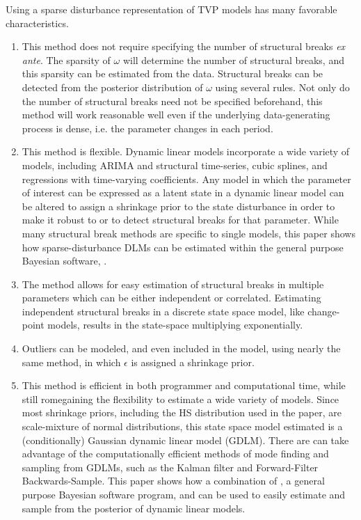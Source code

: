 \documentclass{article}
\begin{document}
Using a sparse disturbance representation of TVP models has many favorable characteristics.
\begin{enumerate}
\item This method does not require specifying the number of structural breaks \textit{ex ante}.
The sparsity of $\omega$ will determine the number of structural breaks, and this sparsity can be estimated from the data.
Structural breaks can be detected from the posterior distribution of $\omega$ using several rules.
Not only do the number of structural breaks need not be specified beforehand, this method will work reasonable well even if the underlying data-generating process is dense, i.e. the parameter changes in each period.
\item This method is flexible.
Dynamic linear models incorporate a wide variety of models, including ARIMA and structural time-series, cubic splines, and regressions with time-varying coefficients.
Any model in which the parameter of interest can be expressed as a latent state in a dynamic linear model can be altered to assign a shrinkage prior to the state disturbance in order to make it robust to or to detect structural breaks for that parameter.
While many structural break methods are specific to single models, this paper shows how sparse-disturbance DLMs can be estimated within the general purpose Bayesian software, \Stan{}.
\item The method allows for easy estimation of structural breaks in multiple parameters which can be either independent or correlated.
Estimating independent structural breaks in a discrete state space model, like change-point models, results in the state-space multiplying exponentially.
\item Outliers can be modeled, and even included in the model, using nearly the same method, in which $\epsilon$ is assigned a shrinkage prior.
\item This method is efficient in both programmer and computational time, while still romegaining the flexibility to estimate a wide variety of models.
Since most shrinkage priors, including the HS distribution used in the paper, are scale-mixture of normal distributions, this state space model estimated is a (conditionally) Gaussian dynamic linear model (GDLM). There are can take advantage of the computationally efficient methods of mode finding and sampling from GDLMs, such as the Kalman filter and Forward-Filter Backwards-Sample.
This paper shows how a combination of \Stan{}, a general purpose Bayesian software program, and \RLang{} can be used to easily estimate and sample from the posterior of dynamic linear models.
\end{enumerate}
\end{document}
